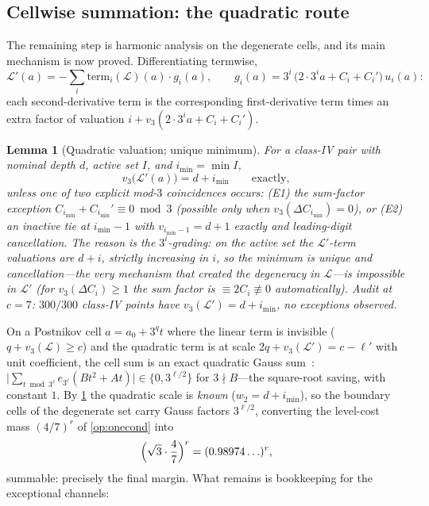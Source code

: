 \documentclass[11pt]{article}
\theoremstyle{plain}
\newtheorem{lemma}{Lemma}
\theoremstyle{definition}
\theoremstyle{remark}
\begin{document}
\subsection*{Cellwise summation: the quadratic route}

The remaining step is harmonic analysis on the degenerate cells, and its
main mechanism is now proved. Differentiating termwise,
\[
\mathcal L'(a)=-\sum_i\mathrm{term}_i(\mathcal L)(a)\cdot g_i(a),
\qquad
g_i(a)=3^i\,\bigl(2\cdot3^ia+C_i+C_i'\bigr)\,u_i(a):
\]
each second-derivative term is the corresponding first-derivative term
times an extra factor of valuation $i+v_3(2\cdot3^ia+C_i+C_i')$.

\begin{lemma}[Quadratic valuation; unique minimum]\label{lem:quadval}
For a class-IV pair with nominal depth $d$, active set $I$, and
$i_{\min}=\min I$,
\[
v_3\bigl(\mathcal L'(a)\bigr)=d+i_{\min}\qquad\text{exactly},
\]
unless one of two explicit mod-$3$ coincidences occurs: \emph{(E1)} the
sum-factor exception $C_{i_{\min}}+C_{i_{\min}}'\equiv0\bmod 3$
(possible only when $v_3(\Delta C_{i_{\min}})=0$), or \emph{(E2)} an
inactive tie at $i_{\min}-1$ with $v_{i_{\min}-1}=d+1$ exactly and
leading-digit cancellation. The reason is the $3^i$-grading: on the active
set the $\mathcal L'$-term valuations are $d+i$, \emph{strictly
increasing in $i$}, so the minimum is unique and cancellation---the very
mechanism that created the degeneracy in $\mathcal L$---is impossible in
$\mathcal L'$ (for $v_3(\Delta C_i)\ge1$ the sum factor is
$\equiv2C_i\not\equiv0$ automatically). Audit at $c=7$: $300/300$
class-IV points have $v_3(\mathcal L')=d+i_{\min}$, no exceptions
observed.
\end{lemma}

On a Postnikov cell $a=a_0+3^qt$ where the linear term is invisible
($q+v_3(\mathcal L)\ge c$) and the quadratic term is at scale
$2q+v_3(\mathcal L')=c-\ell'$ with unit coefficient, the cell sum is an
exact quadratic Gauss sum~\cite{bew1998,iwanieckowalski}:
$\bigl|\sum_{t\bmod3^{\ell}}e_{3^{\ell}}(Bt^2+At)\bigr|
\in\{0,3^{\ell/2}\}$ for $3\nmid B$---the square-root saving, with
constant $1$. By \cref{lem:quadval} the quadratic scale is \emph{known}
($w_2=d+i_{\min}$), so the boundary cells of the degenerate set carry
Gauss factors $3^{\ell/2}$, converting the level-cost mass
$(4/7)^r$ of \cref{op:onecond} into
\[
\Bigl(\sqrt3\cdot\frac47\Bigr)^{r}=(0.98974\ldots)^{r},
\]
summable: precisely the final margin. What remains is bookkeeping for the
exceptional channels:
\end{document}
